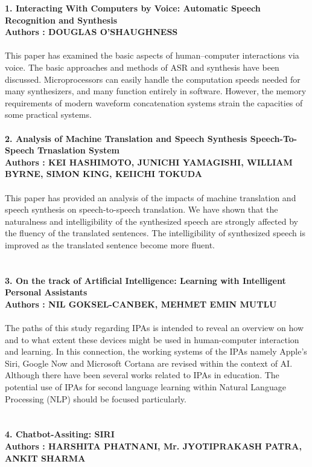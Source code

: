 \documentclass[12pt]{extreport}
\begin{document}
\textbf{1. Interacting With Computers by Voice: Automatic Speech Recognition and Synthesis}\\
\textbf{Authors : DOUGLAS O’SHAUGHNESS}\\\\
This paper has examined the basic aspects of human–computer interactions via voice. The basic approaches and methods of ASR and synthesis have been discussed. Microprocessors can easily handle the computation speeds needed for many synthesizers, and many function entirely in software. However, the memory requirements of modern waveform concatenation systems strain the capacities of some practical systems.\\\\
\textbf{2. Analysis of Machine Translation and Speech Synthesis Speech-To-Speech Trnaslation System}\\
\textbf{Authors : KEI HASHIMOTO, JUNICHI YAMAGISHI, WILLIAM BYRNE, SIMON KING, KEIICHI TOKUDA }\\\\
This paper has provided an analysis of the impacts of machine translation and speech synthesis on speech-to-speech translation. We have shown that the naturalness and intelligibility of the synthesized speech are strongly affected by the fluency of the translated sentences. The intelligibility of synthesized speech is improved as the translated sentence become more ﬂuent.\\
\\\\
\textbf{3. On the track of Artificial Intelligence: Learning with Intelligent Personal Assistants}\\
\textbf{Authors : NIL GOKSEL-CANBEK, MEHMET EMIN MUTLU}\\\\
The paths of this study regarding IPAs is intended to reveal an overview on how and to what extent these devices might be used in human-computer interaction and learning. In this connection, the working systems of the IPAs namely Apple’s Siri, Google Now and Microsoft Cortana are revised within the context of AI. Although there have been several works related to IPAs in education. The potential use of IPAs for second language learning within Natural Language Processing (NLP) should be focused particularly.\\
\\\\
\textbf{4. Chatbot-Assiting: SIRI}\\
\textbf{Authors : HARSHITA PHATNANI, Mr. JYOTIPRAKASH PATRA, ANKIT SHARMA}\\\\
\end{document}
